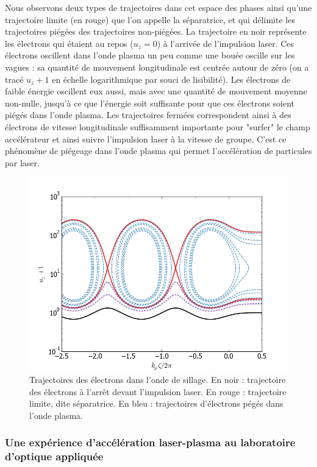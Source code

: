 \documentclass[a4paper]{book}
\begin{document}
Nous observons deux types de trajectoires dans cet espace des phases ainsi qu'une trajectoire limite (en rouge) que l'on appelle la séparatrice, et qui délimite les trajectoires piégées des trajectoires non-piégées. La trajectoire en noir représente les électrons qui étaient au repos ($u_z = 0$) à l'arrivée de l'impulsion laser. Ces électrons oscillent dans l'onde plasma un peu comme une bouée oscille sur les vagues : sa quantité de mouvement longitudinale est centrée autour de zéro (on a tracé $u_z+1$ en échelle logarithmique par souci de lisibilité). Les électrons de faible énergie oscillent eux aussi, mais avec une quantité de mouvement moyenne non-nulle, jusqu'à ce que l'énergie soit suffisante pour que ces électrons soient piégés dans l'onde plasma. Les trajectoires fermées correspondent ainsi à des électrons de vitesse longitudinale suffisamment importante pour "surfer" le champ accélérateur et ainsi suivre l'impulsion laser à la vitesse de groupe. C'est ce phénomène de piégeage dans l'onde plasma qui permet l'accélération de particules par laser. 

\begin{figure}[!htbp]
\begin{center}
\includegraphics[width=12cm]{pictures/trajectories.png}
\end{center}
\caption{Trajectoires des électrons dans l'onde de sillage. En noir : trajectoire des électrons à l'arrêt devant l'impulsion laser. En rouge : trajectoire limite, dite séparatrice. En bleu : trajectoires d'électrons pégés dans l'onde plasma. }
\label{fig:trajectories}
\end{figure}

\subsubsection{Une expérience d'accélération laser-plasma au laboratoire d'optique appliquée}


\printbibliography[title={Bibliographie}]



%
%
\end{document}

